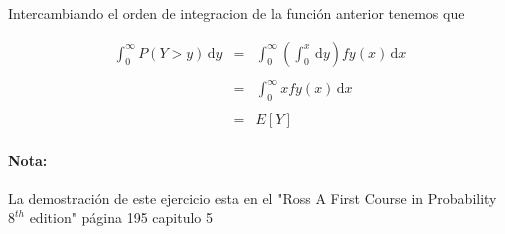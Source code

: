 \documentclass{article}
\begin{document}
    Intercambiando el orden de integracion de la funci\'on  anterior tenemos que 

    \begin{equation*}
        \begin{array}{rcl}
            \int_{0}^{\infty} P \left(Y > y \right) \,\mathrm{d}y &  =  &  \int_{0}^{\infty} \left(\int_{0}^{x}  \,\mathrm{d}y \right) fy\left(x\right) \,\mathrm{d}x 
            \\
            \\
                                                                  &  =  &  \int_{0}^{\infty} x fy\left(x\right) \,\mathrm{d}x
            \\
            \\
                                                                  &  =  &  E\left[Y\right]                                           
        \end{array}
    \end{equation*}

    \paragraph{Nota:} La demostraci\'on de este ejercicio esta en el "Ross A First Course in Probability $8^{th}$ edition"  p\'agina 195 capitulo 5
\end{document}
